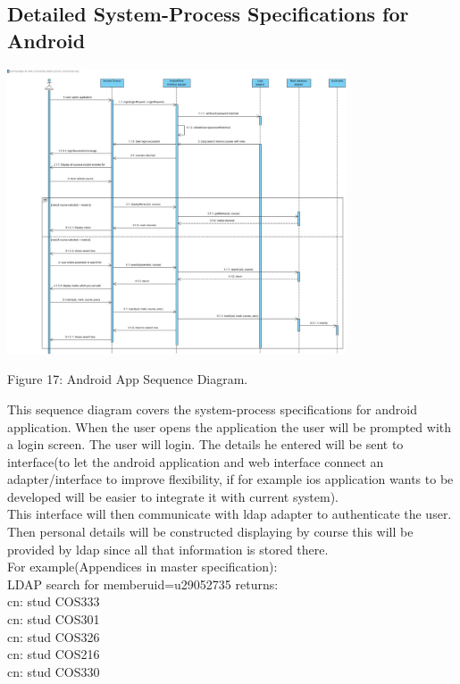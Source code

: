 \documentclass[a4paper]{article}
\begin{document}
\subsection*{Detailed System-Process Specifications for Android}
\includegraphics[width=380px]{Images/APPsequence.jpg}
\begin{center}
Figure 17: Android App Sequence Diagram.
\end{center}
This sequence diagram covers the system-process specifications for android application. When the user opens the application the user will be prompted with a login screen. The user will login. The details he entered will be sent to interface(to let the android application and web interface connect an adapter/interface to improve flexibility, if for example ios application wants to be developed will be easier to integrate it with current system).\\
This interface will then communicate with ldap adapter to authenticate the user. Then personal details will be constructed displaying by course this will be provided by ldap since all that information is stored there.\\
For example(Appendices in master specification):\\
LDAP search for memberuid=u29052735 returns:\\

cn: stud COS333\\
cn: stud COS301\\
cn: stud COS326\\
cn: stud COS216\\
cn: stud COS330\\
\end{document}

